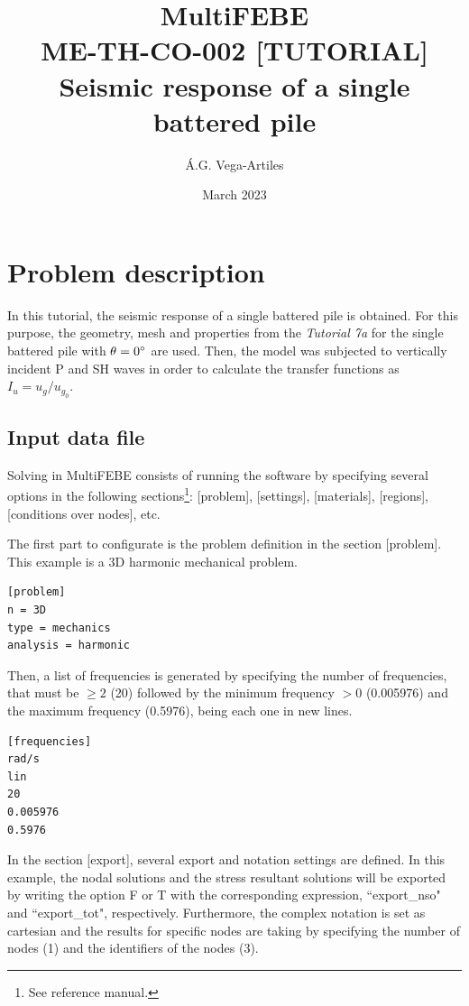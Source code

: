\documentclass[a4]{article}
\title{MultiFEBE \\ ME-TH-CO-002 [TUTORIAL] \\ Seismic response of a single battered pile}
\author{\'A.G. Vega-Artiles}
\date{March 2023}
\begin{document}
\maketitle

\tableofcontents

\section{Problem description}

In this tutorial, the seismic response of a single battered pile is obtained. For this purpose, the geometry, mesh and properties from the \textit{Tutorial 7a} for the single battered pile with $\theta=0\degree$ are used. Then, the model was subjected to vertically incident P and SH waves in order to calculate the transfer functions as $I_u=u_g/u_{g_0}$.

\subsection{Input data file}
Solving in MultiFEBE consists of running the software by specifying several options in the following sections\footnote{See reference manual.}: [problem], [settings], [materials], [regions], [conditions over nodes], etc.

The first part to configurate is the problem definition in the section [problem]. This example is a 3D harmonic mechanical problem.

\begin{Verbatim}	
[problem]
n = 3D
type = mechanics
analysis = harmonic
\end{Verbatim}

Then, a list of frequencies is generated by specifying the number of frequencies, that must be $\geq 2$ (20) followed by the minimum frequency $>0$ (0.005976) and the maximum frequency (0.5976), being each one in new lines.

\begin{Verbatim}
[frequencies]
rad/s
lin
20
0.005976
0.5976
\end{Verbatim}

In the section [export], several export and notation settings are defined. In this example, the nodal solutions and the stress resultant solutions will be exported by writing the option F or T with the corresponding expression, ``export\_nso" and ``export\_tot", respectively. Furthermore, the complex notation is set as cartesian and the results for specific nodes are taking by specifying the number of nodes (1) and the identifiers of the nodes (3). 
\end{document}
